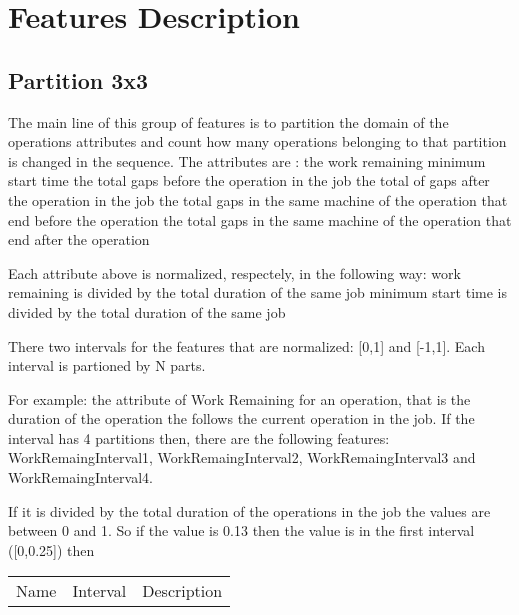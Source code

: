 \documentclass[a4paper,10pt]{article}
\title{}
\author{}
\begin{document}
\maketitle

\begin{abstract}

\end{abstract}

\section{Features Description}


\subsection{Partition 3x3}

The main line of this group of features is to partition the domain of the operations attributes and count how many operations belonging to that partition is changed in the sequence. The attributes are :
the work remaining
 minimum start time
 the total gaps before the operation in the job
 the total of gaps after the operation in the job
 the total gaps in the same machine  of the operation that end before the operation  
 the total gaps in the same machine  of the operation that end after the operation  



Each attribute above is normalized, respectely, in the following way:
 work remaining is divided by  the total duration of the same job
minimum start time is divided by the total duration of the same job








There two intervals for the features that are normalized: [0,1] and [-1,1]. Each interval is partioned by N parts.

For example: the attribute of Work Remaining for an operation, that is the duration of the operation the follows the current operation in the job. If the interval has 4 partitions then, there are the following features: WorkRemaingInterval1, WorkRemaingInterval2, WorkRemaingInterval3 and WorkRemaingInterval4. 



 If it is divided by the total duration of the operations in the job the values are between 0 and 1. So if the value is 0.13 then the value is in the first interval ([0,0.25]) then 



\begin{center}
\begin{tabular}{lll}
Name   & Interval & Description \\ 

\end{tabular}
 \end{center} 
\end{document}
